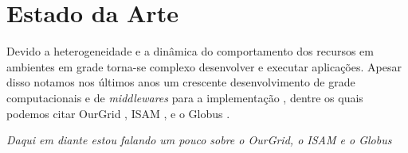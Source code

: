 \section{Estado da Arte}
\label{cap:estado da arte}

Devido a heterogeneidade e a dinâmica do comportamento dos recursos em ambientes em grade torna-se complexo desenvolver e executar aplicações. Apesar disso notamos nos últimos anos um crescente desenvolvimento de grade computacionais e de \emph{middlewares} para a implementação \cite{Silva}, \cite{Santos} dentre os quais podemos citar OurGrid \cite{Silva}, ISAM \cite{Jr.2002}, \cite{Nino2006} e o Globus \cite{Foster1998}.

\emph{Daqui em diante estou falando um pouco sobre o OurGrid, o ISAM e o Globus}
